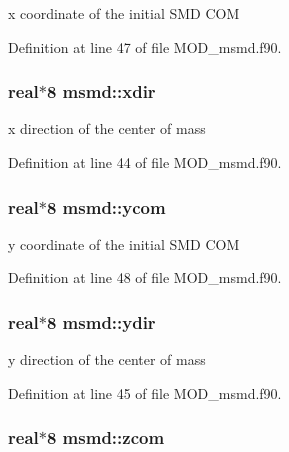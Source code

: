 x coordinate of the initial S\-M\-D C\-O\-M 



Definition at line 47 of file M\-O\-D\-\_\-msmd.\-f90.

\hypertarget{classmsmd_adece962187d68486034a4eafca72632c}{
\subsubsection[{xdir}]{\setlength{\rightskip}{0pt plus 5cm}real$\ast$8 msmd\-::xdir}}\label{classmsmd_adece962187d68486034a4eafca72632c}


x direction of the center of mass 



Definition at line 44 of file M\-O\-D\-\_\-msmd.\-f90.

\hypertarget{classmsmd_ae92757e8de6f57ff77289f5220eda460}{
\subsubsection[{ycom}]{\setlength{\rightskip}{0pt plus 5cm}real$\ast$8 msmd\-::ycom}}\label{classmsmd_ae92757e8de6f57ff77289f5220eda460}


y coordinate of the initial S\-M\-D C\-O\-M 



Definition at line 48 of file M\-O\-D\-\_\-msmd.\-f90.

\hypertarget{classmsmd_a093de4aa2e9c0ee9bddec7c9d664f53f}{
\subsubsection[{ydir}]{\setlength{\rightskip}{0pt plus 5cm}real$\ast$8 msmd\-::ydir}}\label{classmsmd_a093de4aa2e9c0ee9bddec7c9d664f53f}


y direction of the center of mass 



Definition at line 45 of file M\-O\-D\-\_\-msmd.\-f90.

\hypertarget{classmsmd_abe66459722303008741f916ed003751a}{
\subsubsection[{zcom}]{\setlength{\rightskip}{0pt plus 5cm}real$\ast$8 msmd\-::zcom}}\label{classmsmd_abe66459722303008741f916ed003751a}


